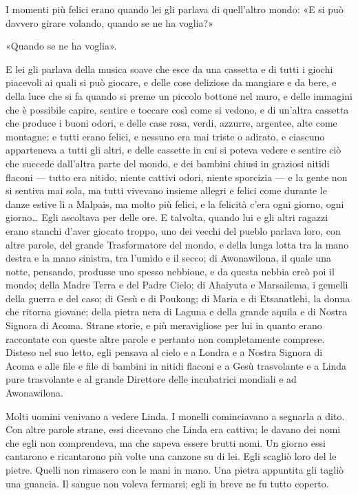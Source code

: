 \documentclass[
a5paper, %
10pt, %
twoside, 
onecolumn, %
openany, %
]{memoir}
\begin{document}
I momenti più felici erano quando lei gli parlava di quell’altro mondo: «E si può davvero girare volando, quando se ne ha voglia?»

«Quando se ne ha voglia».

E lei gli parlava della musica soave che esce da una cassetta e di tutti i giochi piacevoli ai quali si può giocare, e delle cose deliziose da mangiare e da bere, e della luce che si fa quando si preme un piccolo bottone nel muro, e delle immagini che è possibile capire, sentire e toccare così come si vedono, e di un’altra cassetta che produce i buoni odori, e delle case rosa, verdi, azzurre, argentee, alte come montagne; e tutti erano felici, e nessuno era mai triste o adirato, e ciascuno apparteneva a tutti gli altri, e delle cassette in cui si poteva vedere e sentire ciò che succede dall’altra parte del mondo, e dei bambini chiusi in graziosi nitidi flaconi — tutto era nitido, niente cattivi odori, niente sporcizia — e la gente non si sentiva mai sola, ma tutti vivevano insieme allegri e felici come durante le danze estive lì a Malpais, ma molto più felici, e la felicità c’era ogni giorno, ogni giorno… Egli ascoltava per delle ore. E talvolta, quando lui e gli altri ragazzi erano stanchi d’aver giocato troppo, uno dei vecchi del pueblo parlava loro, con altre parole, del grande Trasformatore del mondo, e della lunga lotta tra la mano destra e la mano sinistra, tra l’umido e il secco; di Awonawilona, il quale una notte, pensando, produsse uno spesso nebbione, e da questa nebbia creò poi il mondo; della Madre Terra e del Padre Cielo; di Ahaiyuta e Marsailema, i gemelli della guerra e del caso; di Gesù e di Poukong; di Maria e di Etsanatlehi, la donna che ritorna giovane; della pietra nera di Laguna e della grande aquila e di Nostra Signora di Acoma. Strane storie, e più meravigliose per lui in quanto erano raccontate con queste altre parole e pertanto non completamente comprese. Disteso nel suo letto, egli pensava al cielo e a Londra e a Nostra Signora di Acoma e alle file e file di bambini in nitidi flaconi e a Gesù trasvolante e a Linda pure trasvolante e al grande Direttore delle incubatrici mondiali e ad Awonawilona.

Molti uomini venivano a vedere Linda. I monelli cominciavano a segnarla a dito. Con altre parole strane, essi dicevano che Linda era cattiva; le davano dei nomi che egli non comprendeva, ma che sapeva essere brutti nomi. Un giorno essi cantarono e ricantarono più volte una canzone su di lei. Egli scagliò loro del le pietre. Quelli non rimasero con le mani in mano. Una pietra appuntita gli tagliò una guancia. Il sangue non voleva fermarsi; egli in breve ne fu tutto coperto.
\end{document}
